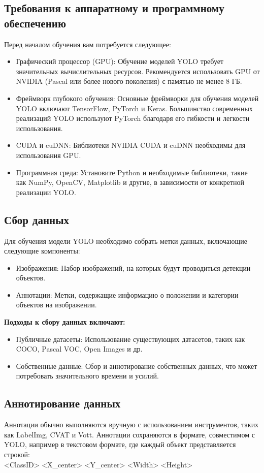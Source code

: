     \subsection{Требования к аппаратному и программному обеспечению}
    Перед началом обучения вам потребуется следующее:
    \begin{itemize}
        \item Графический процессор (GPU): Обучение моделей YOLO требует значительных вычислительных ресурсов. Рекомендуется использовать GPU от NVIDIA (Pascal или более нового поколения) с памятью не менее 8 ГБ.
        \item Фреймворк глубокого обучения: Основные фреймворки для обучения моделей YOLO включают TensorFlow, PyTorch и Keras. Большинство современных реализаций YOLO используют PyTorch благодаря его гибкости и легкости использования.
        \item CUDA и cuDNN: Библиотеки NVIDIA CUDA и cuDNN необходимы для использования GPU.
        \item Программная среда: Установите Python и необходимые библиотеки, такие как NumPy, OpenCV, Matplotlib и другие, в зависимости от конкретной реализации YOLO.
    \end{itemize}

    \subsection{Сбор данных}
    Для обучения модели YOLO необходимо собрать метки данных, включающие следующие компоненты:
    \begin{itemize}
        \item Изображения: Набор изображений, на которых будут проводиться детекции объектов.
        \item Аннотации: Метки, содержащие информацию о положении и категории объектов на изображении.
    \end{itemize}

    \textbf{Подходы к сбору данных включают:}
    \begin{itemize}
        \item Публичные датасеты: Использование существующих датасетов, таких как COCO, Pascal VOC, Open Images и др.
        \item Собственные данные: Сбор и аннотирование собственных данных, что может потребовать значительного времени и усилий.
    \end{itemize}
    
    \subsection{Аннотирование данных}
    Аннотации обычно выполняются вручную с использованием инструментов, таких как LabelImg, CVAT и Vott. Аннотации сохраняются в формате, совместимом с YOLO, например в текстовом формате, где каждый объект представляется строкой: \\
    <Class\-ID> <X\_center> <Y\_center> <Width> <Height>

